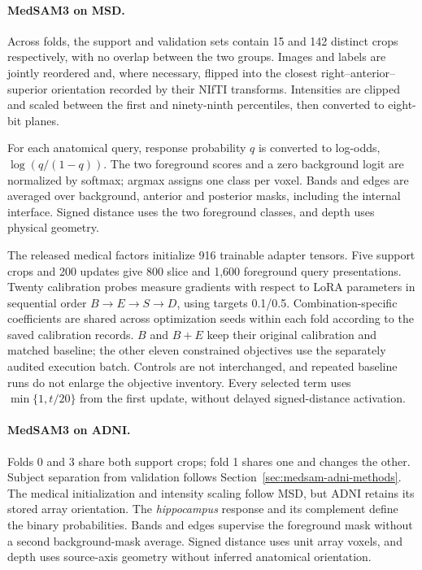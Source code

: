 \documentclass[12pt,a4paper]{article}
\begin{document}
\paragraph{MedSAM3 on MSD.}\label{sec:medsam-methods-details}
Across folds, the support and validation sets contain 15 and 142
distinct crops respectively, with no overlap between the two groups.
Images and labels are jointly reordered and, where necessary, flipped
into the closest right--anterior--superior orientation recorded by
their NIfTI transforms. Intensities are clipped and scaled between
the first and ninety-ninth percentiles, then converted to eight-bit
planes.

For each anatomical query, response probability $q$ is converted to
log-odds, $\log(q/(1-q))$. The two foreground scores and a zero
background logit are normalized by softmax; argmax assigns one class
per voxel. Bands and edges are averaged over background, anterior and
posterior masks, including the internal interface. Signed distance
uses the two foreground classes, and depth uses physical geometry.

The released medical factors initialize 916 trainable adapter tensors.
Five support crops and 200 updates give 800 slice and 1,600 foreground
query presentations. Twenty calibration probes measure gradients with
respect to LoRA parameters in sequential order $B\to E\to S\to D$,
using targets 0.1/0.5. Combination-specific coefficients are shared
across optimization seeds within each fold according to the saved
calibration records. $B$ and $B+E$ keep their original calibration and
matched baseline; the other eleven constrained objectives use the
separately audited execution batch. Controls are not interchanged,
and repeated baseline runs do not enlarge the objective inventory.
Every selected term uses $\min\{1,t/20\}$ from the first update,
without delayed signed-distance activation.

\paragraph{MedSAM3 on ADNI.}\label{sec:medsam-adni-methods-details}
Folds 0 and 3 share both support crops; fold 1 shares one and changes
the other. Subject separation from validation follows
Section~\ref{sec:medsam-adni-methods}. The medical initialization and
intensity scaling follow MSD, but ADNI retains its stored array
orientation. The \emph{hippocampus} response and its complement define
the binary probabilities. Bands and edges supervise the foreground
mask without a second background-mask average. Signed distance uses
unit array voxels, and depth uses source-axis geometry without inferred
anatomical orientation.
\end{document}
